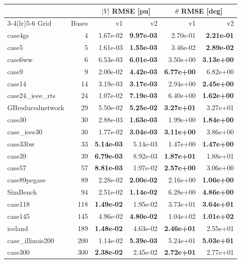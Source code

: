 \documentclass[10pt]{article}
\begin{document}
\begin{table}[H]
\centering\small
\begin{tabular}{lr rr rr}
\toprule
 & & \multicolumn{2}{c}{$|V|$ RMSE [pu]} & \multicolumn{2}{c}{$\theta$ RMSE [deg]} \\
\cmidrule(lr){3-4}\cmidrule(lr){5-6}
Grid & Buses & v1 & v2 & v1 & v2 \\
\midrule
case4gs & 4 & 1.67e-02 & \textbf{9.97e-03} & 2.70e-01 & \textbf{2.21e-01} \\
case5 & 5 & 1.61e-03 & \textbf{1.55e-03} & 3.46e-02 & \textbf{2.89e-02} \\
case6ww & 6 & 6.53e-03 & \textbf{6.01e-03} & 3.50e+00 & \textbf{3.13e+00} \\
case9 & 9 & 2.00e-02 & \textbf{4.42e-03} & \textbf{6.77e+00} & 6.82e+00 \\
case14 & 14 & 3.19e-03 & \textbf{3.17e-03} & 2.94e+00 & \textbf{2.45e+00} \\
case24\_ieee\_rts & 24 & 1.07e-02 & \textbf{7.19e-03} & 6.40e+00 & \textbf{1.62e+00} \\
GBreducednetwork & 29 & 5.50e-02 & \textbf{5.25e-02} & \textbf{3.27e+01} & 3.27e+01 \\
case30 & 30 & 2.88e-03 & \textbf{1.63e-03} & 1.99e+00 & \textbf{1.84e+00} \\
case\_ieee30 & 30 & 1.77e-02 & \textbf{3.04e-03} & \textbf{3.11e+00} & 3.86e+00 \\
case33bw & 33 & \textbf{5.14e-03} & 5.14e-03 & 1.47e+00 & \textbf{1.47e+00} \\
case39 & 39 & \textbf{6.79e-03} & 8.92e-03 & \textbf{1.87e+01} & 1.88e+01 \\
case57 & 57 & \textbf{8.81e-03} & 1.97e-02 & \textbf{2.57e+00} & 3.06e+00 \\
case89pegase & 89 & 2.28e-02 & \textbf{2.00e-02} & 2.16e+00 & \textbf{1.06e+00} \\
SimBench & 94 & 2.51e-02 & \textbf{1.14e-02} & 6.28e+00 & \textbf{4.86e+00} \\
case118 & 118 & \textbf{1.49e-02} & 1.95e-02 & 3.73e+01 & \textbf{3.64e+01} \\
case145 & 145 & 4.96e-02 & \textbf{4.80e-02} & 1.04e+02 & \textbf{1.01e+02} \\
iceland & 189 & \textbf{1.48e-02} & 4.63e-02 & \textbf{2.46e+01} & 2.55e+01 \\
case\_illinois200 & 200 & 1.14e-02 & \textbf{5.39e-03} & 5.24e+01 & \textbf{5.03e+01} \\
case300 & 300 & \textbf{2.38e-02} & 2.45e-02 & \textbf{2.72e+01} & 2.77e+01 \\

\end{tabular}
\end{table}
\end{document}
